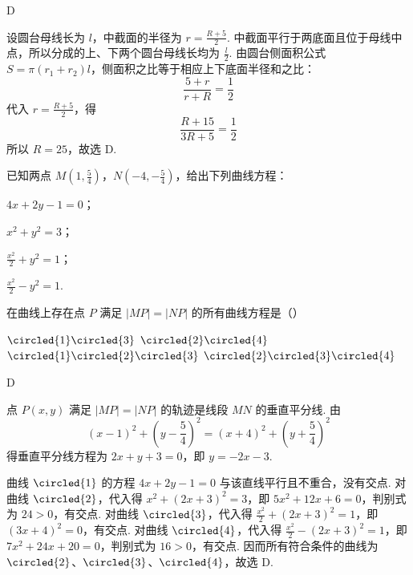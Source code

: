 \begin{answer}
D
\end{answer}

\begin{solution}
设圆台母线长为 \(l\)，中截面的半径为 \(r=\frac{R+5}{2}\). 中截面平行于两底面且位于母线中点，所以分成的上、下两个圆台母线长均为 \(\frac{l}{2}\). 由圆台侧面积公式 \(S=\pi(r_1+r_2)l\)，侧面积之比等于相应上下底面半径和之比：
\[
\frac{5+r}{r+R}=\frac{1}{2}
\]
代入 \(r=\frac{R+5}{2}\)，得
\[
\frac{R+15}{3R+5}=\frac{1}{2}
\]
所以 \(R=25\)，故选 D.
\end{solution}

\begin{problem}
已知两点 \(M\left(1,\frac{5}{4}\right)\)，\(N\left(-4,-\frac{5}{4}\right)\)，给出下列曲线方程：

\begin{circlelist}
\item \(4x+2y-1=0\)；
\item \(x^{2}+y^{2}=3\)；
\item \(\frac{x^{2}}{2}+y^{2}=1\)；
\item \(\frac{x^{2}}{2}-y^{2}=1\).
\end{circlelist}

在曲线上存在点 \(P\) 满足 \(\left|MP\right|=\left|NP\right|\) 的所有曲线方程是（\quad）

\choices
    {\(\circled{1}\circled{3}\)}
    {\(\circled{2}\circled{4}\)}
    {\(\circled{1}\circled{2}\circled{3}\)}
    {\(\circled{2}\circled{3}\circled{4}\)}
\end{problem}

\begin{answer}
D
\end{answer}

\begin{solution}
点 \(P(x,y)\) 满足 \(\left|MP\right|=\left|NP\right|\) 的轨迹是线段 \(MN\) 的垂直平分线. 由
\[
(x-1)^2+\left(y-\frac{5}{4}\right)^2=(x+4)^2+\left(y+\frac{5}{4}\right)^2
\]
得垂直平分线方程为 \(2x+y+3=0\)，即 \(y=-2x-3\).

曲线 \(\circled{1}\) 的方程 \(4x+2y-1=0\) 与该直线平行且不重合，没有交点. 对曲线 \(\circled{2}\)，代入得
\(x^2+(2x+3)^2=3\)，即 \(5x^2+12x+6=0\)，判别式为 \(24>0\)，有交点. 对曲线 \(\circled{3}\)，代入得
\(\frac{x^2}{2}+(2x+3)^2=1\)，即 \((3x+4)^2=0\)，有交点. 对曲线 \(\circled{4}\)，代入得
\(\frac{x^2}{2}-(2x+3)^2=1\)，即 \(7x^2+24x+20=0\)，判别式为 \(16>0\)，有交点. 因而所有符合条件的曲线为 \(\circled{2}\)、\(\circled{3}\)、\(\circled{4}\)，故选 D.
\end{solution}

